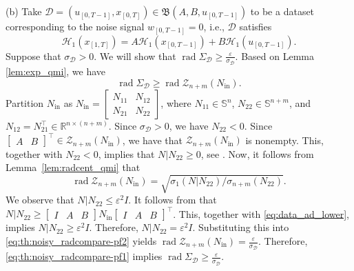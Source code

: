 \documentclass[journal,twoside,web]{ieeecolor}
\DeclareMathOperator{\rad}{rad}
\begin{document}
(b) Take $\mathcal{D}=(u_{[0,T-1]},x_{[0,T]})\in\mathfrak{B}(A,B,u_{[0,T-1]})$ to be a dataset corresponding to the noise signal $w_{[0,T-1]}=0$, i.e., $\mathcal{D}$ satisfies
\begin{equation}
\label{eq:data_ad_lower}
\mathcal{H}_1(x_{[1,T]})=A\mathcal{H}_1(x_{[0,T-1]})+B\mathcal{H}_1(u_{[0,T-1]}).
\end{equation}
Suppose that $\sigma_\mathcal{D}>0$. We will show that $\rad\Sigma_\mathcal{D}\geq \frac{\varepsilon}{\sigma_\mathcal{D}}$. Based on Lemma \ref{lem:exp_qmi}, we have
\begin{equation}
\label{eq:th:noisy_radcompare-pf1}
\rad\Sigma_\mathcal{D}\geq\rad\mathcal{Z}_{n+m}(N_\text{in}).
\end{equation}
Partition $N_\text{in}$ as $N_\text{in}=\begin{bmatrix}
N_{11} & N_{12} \\
N_{21} & N_{22}
\end{bmatrix}$, where $N_{11}\in\mathbb{S}^n$, $N_{22}\in\mathbb{S}^{n+m}$, and $N_{12}=N_{21}^\top\in\mathbb{R}^{n\times (n+m)}$. Since $\sigma_\mathcal{D}>0$, we have $N_{22}<0$. Since $\begin{bmatrix}
A & B
\end{bmatrix}^\top\in\mathcal{Z}_{n+m}(N_\text{in})$, we have that $\mathcal{Z}_{n+m}(N_\text{in})$ is nonempty. This, together with $N_{22}<0$, implies that \mbox{$N|N_{22}\geq 0$}, see \cite[p. 2257]{HenkQMI2023}. Now, it follows from Lemma~\ref{lem:radcent_qmi} that
\begin{equation}
\label{eq:th:noisy_radcompare-pf2}
\rad \mathcal{Z}_{n+m}(N_\text{in})=\sqrt{\sigma_1(N|N_{22})/\sigma_{n+m}(N_{22})}.
\end{equation}
We observe that $N|N_{22}\leq\varepsilon^2 I$. It follows from \cite[Eq. (3.4)]{HenkQMI2023} that $N|N_{22}\geq \begin{bmatrix}
I \!&\! A \!&\! B
\end{bmatrix} N_\text{in} \begin{bmatrix}
I \!&\! A \!&\! B
\end{bmatrix}^\top$. This, together with \eqref{eq:data_ad_lower}, implies $N|N_{22}\geq \varepsilon^2 I$. Therefore, \mbox{$N|N_{22}=\varepsilon^2 I$}. Substituting this into \eqref{eq:th:noisy_radcompare-pf2} yields $\rad \mathcal{Z}_{n+m}(N_\text{in})=\frac{\varepsilon}{\sigma_\mathcal{D}}$. Therefore, \eqref{eq:th:noisy_radcompare-pf1} implies \mbox{$\rad\Sigma_\mathcal{D}\geq \frac{\varepsilon}{\sigma_\mathcal{D}}$}. 
\hfill \QED
\end{document}
